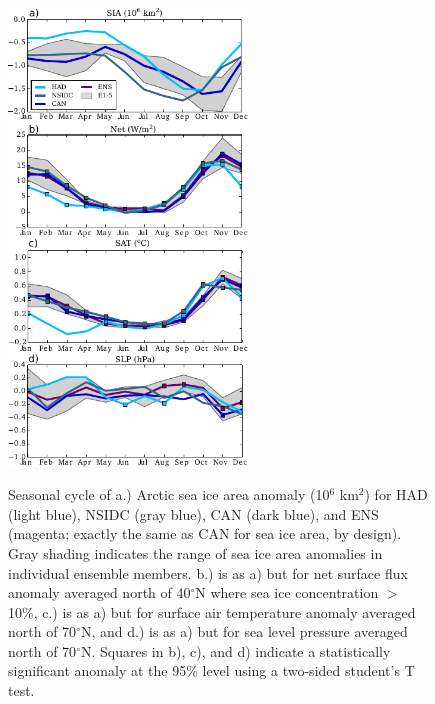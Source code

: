 \documentclass[twocol]{ametsoc}
\begin{document}
\begin{figure}[t]
  \noindent\includegraphics[width=15pc,angle=0]{seacycles.pdf}\\
  \caption{Seasonal cycle of a.) Arctic sea ice area anomaly (10$^6$ km$^2$) for HAD (light blue), NSIDC (gray blue), CAN (dark blue), and ENS (magenta; exactly the same as CAN for sea ice area, by design). Gray shading indicates the range of sea ice area anomalies in individual ensemble members. b.) is as a) but for net surface flux anomaly averaged north of 40$^\circ$N where sea ice concentration $>$ 10\%, c.) is as a) but for surface air temperature anomaly averaged north of 70$^\circ$N, and d.) is as a) but for sea level pressure averaged north of 70$^\circ$N. Squares in b), c), and d) indicate a statistically significant anomaly at the 95\% level using a two-sided student's T test.
}\label{fig:fig2}
\end{figure}
\end{document}

